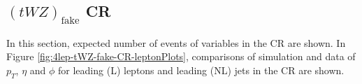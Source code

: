 \subsection{$(tWZ)_{\text{fake}}$ CR}
\label{sec:controlplotstetralepton-tWZ-fake-CR}


In this section, expected number of events of variables in the \tWZfake CR are shown. In Figure \ref{fig:4lep-tWZ-fake-CR-leptonPlots}, comparisons of simulation and data of $p_{T}$, $\eta$ and $\phi$ for leading (L) leptons and leading (NL) jets in the \tWZfake CR are shown.
\begin{figure}[htbp]
\centering
  \begin{tabular}{ccc}



\end{tabular}
\end{figure}
